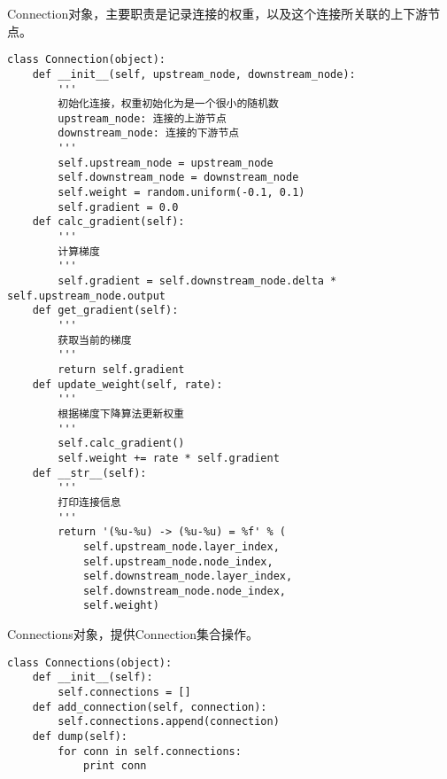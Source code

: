 Connection对象，主要职责是记录连接的权重，以及这个连接所关联的上下游节点。
\begin{lstlisting}
class Connection(object):
    def __init__(self, upstream_node, downstream_node):
        '''
        初始化连接，权重初始化为是一个很小的随机数
        upstream_node: 连接的上游节点
        downstream_node: 连接的下游节点
        '''
        self.upstream_node = upstream_node
        self.downstream_node = downstream_node
        self.weight = random.uniform(-0.1, 0.1)
        self.gradient = 0.0
    def calc_gradient(self):
        '''
        计算梯度
        '''
        self.gradient = self.downstream_node.delta * self.upstream_node.output
    def get_gradient(self):
        '''
        获取当前的梯度
        '''
        return self.gradient
    def update_weight(self, rate):
        '''
        根据梯度下降算法更新权重
        '''
        self.calc_gradient()
        self.weight += rate * self.gradient
    def __str__(self):
        '''
        打印连接信息
        '''
        return '(%u-%u) -> (%u-%u) = %f' % (
            self.upstream_node.layer_index, 
            self.upstream_node.node_index,
            self.downstream_node.layer_index, 
            self.downstream_node.node_index, 
            self.weight)
\end{lstlisting}

Connections对象，提供Connection集合操作。
\begin{lstlisting}
class Connections(object):
    def __init__(self):
        self.connections = []
    def add_connection(self, connection):
        self.connections.append(connection)
    def dump(self):
        for conn in self.connections:
            print conn
\end{lstlisting}

